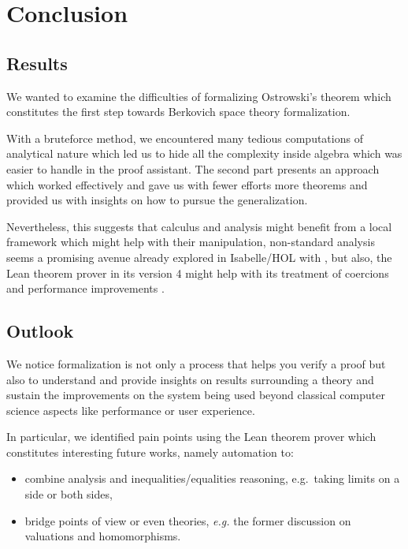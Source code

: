 \documentclass[
]{article}
\providecommand{\tightlist}{%
  \setlength{\itemsep}{0pt}\setlength{\parskip}{0pt}}
\begin{document}
\hypertarget{conclusion}{%
\section{\texorpdfstring{Conclusion
\label{sec:conclusion}}{Conclusion }}\label{conclusion}}

\vspace*{-0.2em}

\hypertarget{results}{%
\subsection{Results}\label{results}}

We wanted to examine the difficulties of formalizing Ostrowski's theorem
which constitutes the first step towards Berkovich space theory
formalization.

With a bruteforce method, we encountered many tedious computations of
analytical nature which led us to hide all the complexity inside algebra
which was easier to handle in the proof assistant. The second part
presents an approach which worked effectively and gave us with fewer
efforts more theorems and provided us with insights on how to pursue the
generalization.

Nevertheless, this suggests that calculus and analysis might benefit
from a local framework which might help with their manipulation,
non-standard analysis seems a promising avenue already explored in
Isabelle/HOL with \autocite{fleuriot2000mechanization}, but also, the
Lean theorem prover in its version 4 might help with its treatment of
coercions and performance improvements \autocite{Lean4_2021}.

\vspace*{-0.2em}

\hypertarget{outlook}{%
\subsection{Outlook}\label{outlook}}

We notice formalization is not only a process that helps you verify a
proof but also to understand and provide insights on results surrounding
a theory and sustain the improvements on the system being used beyond
classical computer science aspects like performance or user experience.

In particular, we identified pain points using the Lean theorem prover
which constitutes interesting future works, namely automation to:

\begin{itemize}
\tightlist
\item
  combine analysis and inequalities/equalities reasoning, e.g.~taking
  limits on a side or both sides,
\item
  bridge points of view or even theories, \emph{e.g.} the former
  discussion on valuations and homomorphisms.
\end{itemize}
\end{document}
